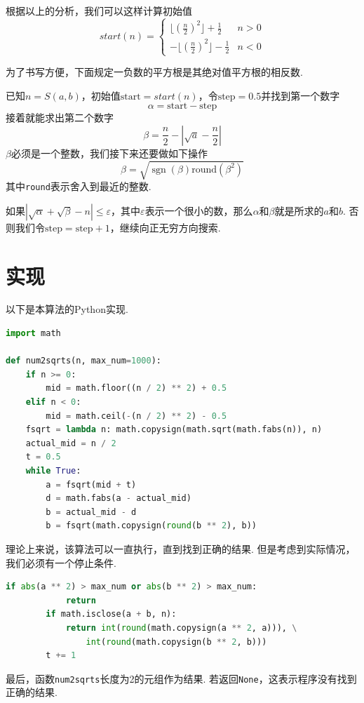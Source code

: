 \documentclass[a4paper, UTF8]{ctexart}
\DeclareMathOperator{\sgn}{\mathrm{sgn}}
\begin{document}
根据以上的分析，我们可以这样计算初始值
\[
    start(n)=
    \begin{cases}
        \lfloor(\frac{n}{2})^2\rfloor+\frac{1}{2}  &n>0 \\
        -\lfloor(\frac{n}{2})^2\rfloor-\frac{1}{2} &n<0
    \end{cases}
\]

为了书写方便，下面规定一负数的平方根是其绝对值平方根的相反数.

已知$n=S(a,b)$，初始值$\text{start}=start(n)$，令$\text{step}=0.5$并找到第一个数字\[\alpha=\text{start}-\text{step}\]接着就能求出第二个数字\[\beta=\frac{n}{2}-|\sqrt{a}-\frac{n}{2}|\]$\beta$必须是一个整数，我们接下来还要做如下操作\[\beta=\sqrt{\sgn(\beta)\mathrm{round}(\beta^2)}\]其中\verb|round|表示舍入到最近的整数.

如果$|\sqrt{\alpha}+\sqrt{\beta}-n|\leq\varepsilon$，其中$\varepsilon$表示一个很小的数，那么$\alpha$和$\beta$就是所求的$a$和$b$. 否则我们令$\text{step}=\text{step}+1$，继续向正无穷方向搜索.

\section{实现}
以下是本算法的Python实现.

\begin{lstlisting}[language=python, name=example1]
import math

def num2sqrts(n, max_num=1000):
    if n >= 0:
        mid = math.floor((n / 2) ** 2) + 0.5
    elif n < 0:
        mid = math.ceil(-(n / 2) ** 2) - 0.5
    fsqrt = lambda n: math.copysign(math.sqrt(math.fabs(n)), n)
    actual_mid = n / 2
    t = 0.5
    while True:
        a = fsqrt(mid + t)
        d = math.fabs(a - actual_mid)
        b = actual_mid - d
        b = fsqrt(math.copysign(round(b ** 2), b))
\end{lstlisting}
理论上来说，该算法可以一直执行，直到找到正确的结果. 但是考虑到实际情况，我们必须有一个停止条件.
\begin{lstlisting}[language=python, name=example1]
        if abs(a ** 2) > max_num or abs(b ** 2) > max_num:
            return
        if math.isclose(a + b, n):
            return int(round(math.copysign(a ** 2, a))), \
                int(round(math.copysign(b ** 2, b)))
        t += 1
\end{lstlisting}
最后，函数\verb|num2sqrts|长度为2的元组作为结果. 若返回\verb|None|，这表示程序没有找到正确的结果.
\end{document}
